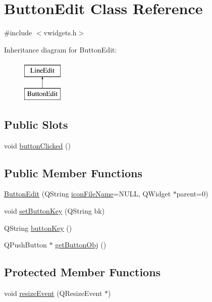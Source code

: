 \hypertarget{classButtonEdit}{
\section{ButtonEdit Class Reference}
\label{classButtonEdit}
}


{\ttfamily \#include $<$vwidgets.h$>$}

Inheritance diagram for ButtonEdit:\begin{figure}[H]
\begin{center}
\leavevmode
\includegraphics[height=2.000000cm]{classButtonEdit}
\end{center}
\end{figure}
\subsection*{Public Slots}
\begin{DoxyCompactItemize}
\item 
void \hyperlink{classButtonEdit_a5f122d262f539f9b4573f0038dee5b63}{buttonClicked} ()
\end{DoxyCompactItemize}
\subsection*{Public Member Functions}
\begin{DoxyCompactItemize}
\item 
\hyperlink{classButtonEdit_a9a6e3658bb796d5cd3ea99d1a19e8326}{ButtonEdit} (QString \hyperlink{classButtonEdit_a609d52554a0d2943f453d1cffc89c566}{iconFileName}=NULL, QWidget $\ast$parent=0)
\item 
void \hyperlink{classButtonEdit_a5d38b77fee50b8052338542e1ae568a9}{setButtonKey} (QString bk)
\item 
QString \hyperlink{classButtonEdit_a685a87378838136bd8b72443ddc888e8}{buttonKey} ()
\item 
QPushButton $\ast$ \hyperlink{classButtonEdit_a40c63eff1e9a16d817c017f629a4872f}{getButtonObj} ()
\end{DoxyCompactItemize}
\subsection*{Protected Member Functions}
\begin{DoxyCompactItemize}
\item 
void \hyperlink{classButtonEdit_a70d44e2f9fb64cad1656d4151c757de9}{resizeEvent} (QResizeEvent $\ast$)
\end{DoxyCompactItemize}

